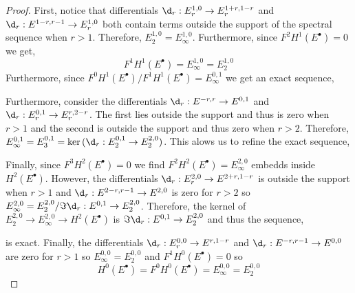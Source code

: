 \documentclass[12pt]{article}
\begin{document}
\begin{proof}
First, notice that differentials $\d_r : E^{1, 0}_r \to E^{1 + r, 1 - r}_r$ and $\d_r : E^{1 - r, r - 1} \to E^{1, 0}_r$ both contain terms outside the support of the spectral sequence when $r > 1$. Therefore, $E^{1,0}_2 = E^{1,0}_{\infty}$. Furthermore, since $F^2 H^1(E^\bullet) = 0$ we get,
\[ F^1 H^1(E^\bullet) = E^{1, 0}_\infty = E^{1, 0}_2 \]
Furthermore, since $F^0 H^1(E^\bullet) / F^1 H^1(E^\bullet) = E^{0, 1}_\infty$ we get an exact sequence,
\begin{center}
\end{center}
Furthermore, consider the differentials $\d_r : E^{-r, r} \to E^{0, 1}$ and $\d_r : E^{0, 1}_r \to E^{r, 2-r}_r$. The first lies outside the support and thus is zero when $r > 1$ and the second is outside the support and thus zero when $r > 2$. Therefore, $E^{0, 1}_\infty = E^{0, 1}_3 = \ker{(\d_r : E^{0, 1}_2 \to E^{2, 0}_2)}$. 
This alows us to refine the exact sequence,
\begin{center}
\end{center}
Finally, since $F^3 H^2(E^\bullet) = 0$ we find $F^2 H^2(E^\bullet) = E^{2, 0}_\infty$ embedds inside $H^2(E^\bullet)$. However, the differentials $\d_r : E^{2,0}_r \to E^{2+r, 1-r}$ is outside the support when $r > 1$ and $\d_r : E^{2-r, r-1} \to E^{2, 0}$ is zero for $r > 2$ so $E^{2,0}_\infty = E^{2, 0}_2 / \Im{\d_r : E^{0, 1} \to E^{2, 0}_2}$. Therefore, the kernel of $E^{2, 0}_2 \to E^{2, 0}_\infty \to H^2(E^\bullet)$ is $\Im{\d_r : E^{0, 1} \to E_2^{2, 0}}$ and thus the sequence,
\begin{center}
\end{center}
is exact. Finally, the differentials $\d_r : E^{0,0}_r \to E^{r, 1-r}$ and $\d_r : E^{-r, r-1} \to E^{0,0}$ are zero for $r > 1$ so $E^{0,0}_\infty = E^{0,0}_2$ and $F^1 H^0(E^\bullet) = 0$ so 
\[ H^0(E^\bullet) = F^0 H^0(E^\bullet) = E^{0, 0}_\infty = E^{0, 0}_2 \]
\end{proof}
\end{document}
